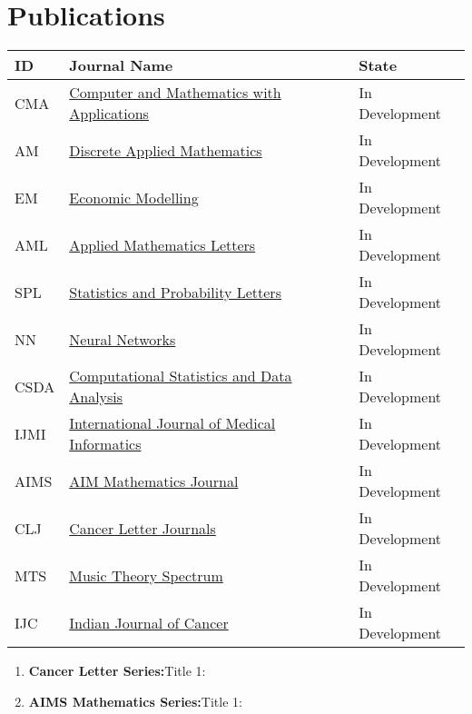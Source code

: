 \documentclass{ResumeDesignFormat1}
\begin{document}
\section{Publications}
\begin{table}[ht]
\footnotesize
\centering
\begin{tabular}{p{1cm}p{6cm}p{2cm}}
 \hline
 ID & Journal Name & State \\ 
 \hline
CMA & {\href{http://mathlearningspace.weebly.com/}{\textcolor{c5}{Computer and Mathematics with Applications}}} & In Development\\
AM & {\href{http://mathlearningspace.weebly.com/}{\textcolor{c2}{Discrete Applied Mathematics}}} & In Development \\
EM & {\href{http://mathlearningspace.weebly.com/}{\textcolor{c1}{Economic Modelling}}} & In Development \\
AML & {\href{http://mathlearningspace.weebly.com/}{\textcolor{c2}{Applied Mathematics Letters}}} & In Development\\
SPL & {\href{http://mathlearningspace.weebly.com/}{\textcolor{c3}{Statistics and Probability Letters}}} & In Development \\
NN & {\href{http://mathlearningspace.weebly.com/}{\textcolor{c4}{Neural Networks}}} & In Development\\
CSDA & {\href{http://mathlearningspace.weebly.com/}{\textcolor{c1}{Computational Statistics and Data Analysis}}} & In Development\\
IJMI & {\href{http://mathlearningspace.weebly.com/}{\textcolor{c5}{International Journal of Medical Informatics}}} & In Development\\
AIMS & {\href{http://mathlearningspace.weebly.com/}{\textcolor{c5}{AIM Mathematics Journal}}} & In Development\\
CLJ & {\href{http://mathlearningspace.weebly.com/}{\textcolor{c5}{Cancer Letter Journals}}} & In Development\\
MTS & {\href{http://mathlearningspace.weebly.com/}{\textcolor{c5}{Music Theory Spectrum}}} & In Development\\
IJC & {\href{http://mathlearningspace.weebly.com/}{\textcolor{c5}{Indian Journal of Cancer}}} & In Development\\
 \hline
\end{tabular}
\end{table}

\begin{enumerate}
\item \textbf{Cancer Letter Series:}\textcolor{c4}{Title 1:}
 \item \textbf{AIMS Mathematics Series:}{Title 1:}
\end{enumerate}
\end{document}
